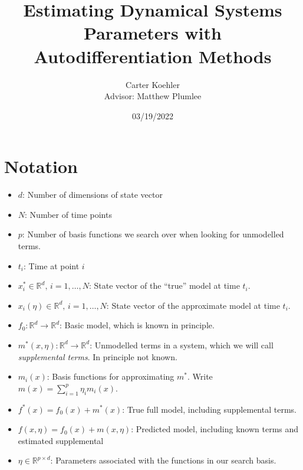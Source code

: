 \documentclass[12pt]{article}
\author{Carter Koehler\\{\small Advisor: Matthew Plumlee}}
\title{Estimating Dynamical Systems Parameters with Autodifferentiation Methods}
\date{03/19/2022}
\begin{document}
\maketitle



  


\section{Notation}

\begin{itemize}

\item
  $d$: Number of dimensions of state vector

\item
  $N$: Number of time points

\item
  $p$: Number of basis functions we search over when looking for unmodelled terms.

\item
  $t_i$: Time at point $i$
  
\item
  $x_i^* \in \mathbb{R}^d,\, i=1,\ldots, N$: State vector of the ``true'' model at time $t_i$. 

\item
  $x_i(\eta) \in \mathbb{R}^d,\, i=1,\ldots, N$: State vector of the approximate model at time $t_i$. 
  
\item
  $f_0: \mathbb{R}^d \to \mathbb{R}^d$: Basic model, which is known in principle.

\item
  $m^*(x, \eta): \mathbb{R}^d \to \mathbb{R}^d$: Unmodelled terms in a system, which we will call \textit{supplemental terms}. In principle not known.

\item
  $m_i(x)$: Basis functions for approximating $m^*$. Write $m(x) = \sum_{i=1}^{p} \eta_i m_i(x)$.

\item
  $f^*(x) = f_0(x) + m^*(x)$: True full model, including supplemental terms.

\item
  $f(x, \eta) = f_0(x) + m(x, \eta)$: Predicted model, including known terms and estimated supplemental  
  
\item
  $\eta \in \mathbb{R}^{p \times d}$: Parameters associated with the functions in our search basis.

\end{itemize}
\end{document}
